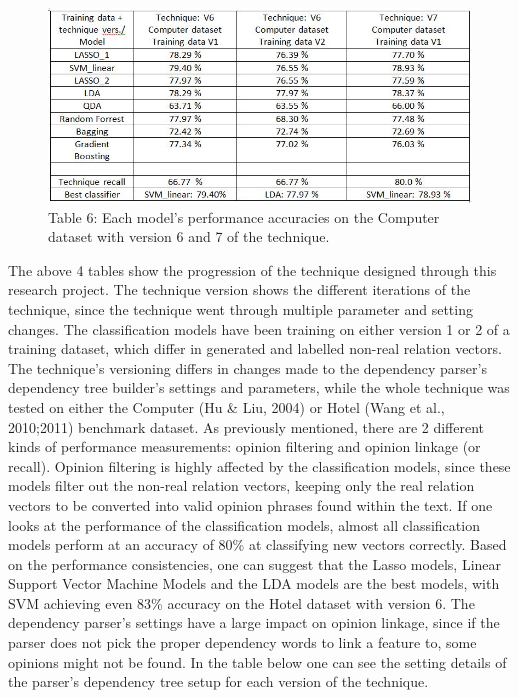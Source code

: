 \documentclass{sig-alternate}
\begin{document}
\begin{figure}
\centering
\includegraphics[scale=0.55]{images/res4.JPG}
Table 6: Each model's performance accuracies on the Computer dataset with version 6 and 7 of the technique.
\end{figure}

The above 4 tables show the progression of the technique designed through this research project. The technique version shows the different iterations of the technique, since the technique went through multiple parameter and setting changes.  The classification models have been training on either version 1 or 2 of a training dataset, which differ in generated and labelled non-real relation vectors. The technique's versioning differs in changes made to the dependency parser's dependency tree builder's settings and parameters, while the whole technique was tested on either the Computer (Hu \& Liu, 2004) or Hotel (Wang et al., 2010;2011) benchmark dataset.
As previously mentioned, there are 2 different kinds of performance measurements: opinion filtering and opinion linkage (or recall). Opinion filtering is highly affected by the classification models, since these models filter out the non-real relation vectors, keeping only the real relation vectors to be converted into valid opinion phrases found within the text. If one looks at the performance of the classification models, almost all classification models perform at an accuracy of 80\% at classifying new vectors correctly. Based on the performance consistencies, one can suggest that the Lasso models, Linear Support Vector Machine Models and the LDA models are the best models, with SVM achieving even 83\% accuracy on the Hotel dataset with version 6.
The dependency parser's settings have a large impact on opinion linkage, since if the parser does not pick the proper dependency words to link a feature to, some opinions might not be found. In the table below one can see the setting details of the parser's dependency tree setup for each version of the technique.
\end{document}
